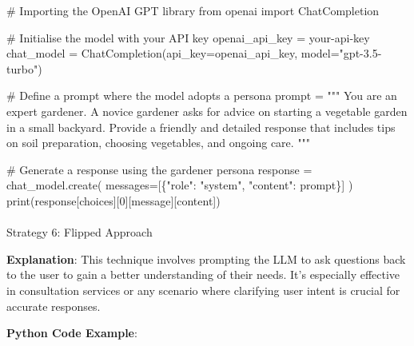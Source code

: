 \documentclass[
]{agujournal2019}
\makeatletter
\let\oldparagraph\paragraph
\renewcommand{\paragraph}{
    \@ifstar
      \xxxParagraphStar
      \xxxParagraphNoStar
  }
\newcommand{\xxxParagraphStar}[1]{\oldparagraph*{#1}\mbox{}}
\newcommand{\xxxParagraphNoStar}[1]{\oldparagraph{#1}\mbox{}}
\newenvironment{Shaded}{\begin{snugshade}}{\end{snugshade}}
\newcommand{\BuiltInTok}[1]{\textcolor[rgb]{0.00,0.23,0.31}{#1}}
\newcommand{\CommentTok}[1]{\textcolor[rgb]{0.37,0.37,0.37}{#1}}
\newcommand{\DecValTok}[1]{\textcolor[rgb]{0.68,0.00,0.00}{#1}}
\newcommand{\ImportTok}[1]{\textcolor[rgb]{0.00,0.46,0.62}{#1}}
\newcommand{\NormalTok}[1]{\textcolor[rgb]{0.00,0.23,0.31}{#1}}
\newcommand{\OperatorTok}[1]{\textcolor[rgb]{0.37,0.37,0.37}{#1}}
\newcommand{\StringTok}[1]{\textcolor[rgb]{0.13,0.47,0.30}{#1}}
\makeatother
\begin{document}
\begin{Shaded}
\begin{Highlighting}[]
\CommentTok{\# Importing the OpenAI GPT library}
\ImportTok{from}\NormalTok{ openai }\ImportTok{import}\NormalTok{ ChatCompletion}

\CommentTok{\# Initialise the model with your API key}
\NormalTok{openai\_api\_key }\OperatorTok{=} \StringTok{\textquotesingle{}your{-}api{-}key\textquotesingle{}}
\NormalTok{chat\_model }\OperatorTok{=}\NormalTok{ ChatCompletion(api\_key}\OperatorTok{=}\NormalTok{openai\_api\_key, model}\OperatorTok{=}\StringTok{"gpt{-}3.5{-}turbo"}\NormalTok{)}

\CommentTok{\# Define a prompt where the model adopts a persona}
\NormalTok{prompt }\OperatorTok{=} \StringTok{"""}
\StringTok{You are an expert gardener. A novice gardener asks for advice on starting a vegetable garden in a small backyard. Provide a friendly and detailed response that includes tips on soil preparation, choosing vegetables, and ongoing care.}
\StringTok{"""}

\CommentTok{\# Generate a response using the gardener persona}
\NormalTok{response }\OperatorTok{=}\NormalTok{ chat\_model.create(}
\NormalTok{    messages}\OperatorTok{=}\NormalTok{[\{}\StringTok{"role"}\NormalTok{: }\StringTok{"system"}\NormalTok{, }\StringTok{"content"}\NormalTok{: prompt\}]}
\NormalTok{)}
\BuiltInTok{print}\NormalTok{(response[}\StringTok{\textquotesingle{}choices\textquotesingle{}}\NormalTok{][}\DecValTok{0}\NormalTok{][}\StringTok{\textquotesingle{}message\textquotesingle{}}\NormalTok{][}\StringTok{\textquotesingle{}content\textquotesingle{}}\NormalTok{])}
\end{Highlighting}
\end{Shaded}

\paragraph{Strategy 6: Flipped
Approach}\label{strategy-6-flipped-approach}

\textbf{Explanation}: This technique involves prompting the LLM to ask
questions back to the user to gain a better understanding of their
needs. It's especially effective in consultation services or any
scenario where clarifying user intent is crucial for accurate responses.

\textbf{Python Code Example}:
\end{document}
